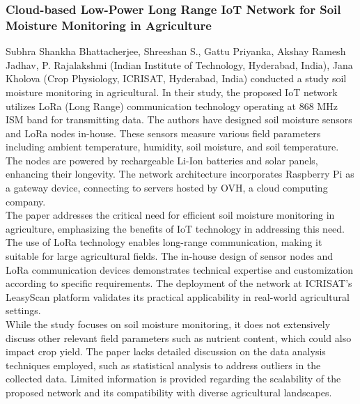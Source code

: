 \documentclass[12pt, a4paper]{article}
\begin{document}
\subsubsection{Cloud-based Low-Power Long Range IoT Network for Soil Moisture Monitoring in Agriculture}
Subhra Shankha Bhattacherjee, Shreeshan S., Gattu Priyanka, Akshay Ramesh Jadhav, P. Rajalakshmi (Indian Institute of Technology, Hyderabad, India), Jana Kholova (Crop Physiology, ICRISAT, Hyderabad, India) conducted a study soil moisture monitoring in agricultural.
In their study, the proposed IoT network utilizes LoRa (Long Range) communication technology operating
at 868 MHz ISM band for transmitting data. The authors have designed soil moisture sensors and LoRa nodes in-house. These sensors measure various field parameters including ambient temperature, humidity, soil moisture, and soil temperature. The nodes are powered by rechargeable Li-Ion batteries and solar panels, enhancing their longevity. The network architecture incorporates Raspberry Pi as a gateway device, connecting to servers hosted by OVH, a cloud computing company.\\
The paper addresses the critical need for efficient soil moisture monitoring in agriculture,
emphasizing the benefits of IoT technology in addressing this need. The use of LoRa technology enables long-range communication, making it suitable for large agricultural fields. The in-house design of sensor nodes and LoRa communication devices demonstrates technical expertise and customization according to specific requirements. The deployment of the network at ICRISAT's LeasyScan platform validates its practical applicability in real-world agricultural settings.\\
While the study focuses on soil moisture monitoring, it does not extensively discuss other relevant field parameters such as nutrient content, which could also impact crop yield. The paper lacks detailed discussion on the data analysis techniques employed, such as statistical analysis to address outliers in the collected data. Limited information is provided regarding the scalability of the proposed network and its compatibility with diverse agricultural landscapes.
\end{document}
